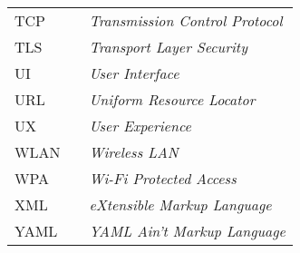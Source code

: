 \begin{table}[H]
\begin{tabular}{lll}
TCP   &  & \textit{Transmission Control Protocol}                    \\
TLS   &  & \textit{Transport Layer Security}                         \\
UI    &  & \textit{User Interface}                                   \\
URL   &  & \textit{Uniform Resource Locator}                         \\
UX    &  & \textit{User Experience}                                  \\
WLAN  &  & \textit{Wireless LAN}                                     \\
WPA   &  & \textit{Wi-Fi Protected Access}                           \\
XML   &  & \textit{eXtensible Markup Language}                       \\
YAML  &  & \textit{YAML Ain't Markup Language}
\end{tabular}
\end{table}
